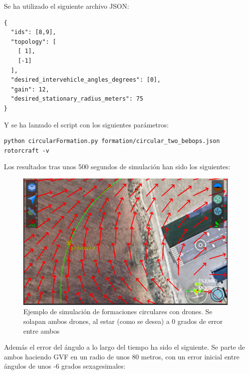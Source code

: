 Se ha utilizado el siguiente archivo JSON:

\begin{lstlisting}[style=CodigoC]
{
  "ids": [8,9],
  "topology": [
    [ 1],
    [-1]
  ],
  "desired_intervehicle_angles_degrees": [0],
  "gain": 12,
  "desired_stationary_radius_meters": 75
}
\end{lstlisting}

Y se ha lanzado el script con los siguientes parámetros:

\begin{lstlisting}[style=CodigoBash]
python circularFormation.py formation/circular_two_bebops.json rotorcraft -v
\end{lstlisting}

Los resultados tras unos 500 segundos de simulación han sido los siguientes:

\begin{figure}[!h]
    \centering
    \includegraphics[width=0.99\textwidth]{img/fig/fig4.3-circular-formation-simulation-sample.png}
    \caption{Ejemplo de simulación de formaciones circulares con drones. 
    Se solapan ambos drones, al estar (como se desea) a 0 grados de error entre ambos}
    \label{fig:circular-formation-simulation}
\end{figure}

Además el error del ángulo a lo largo del tiempo ha sido el siguiente. 
Se parte de ambos haciendo GVF en un radio de unos 80 metros, con un error inicial entre ángulos de unos -6 grados sexagesimales:

